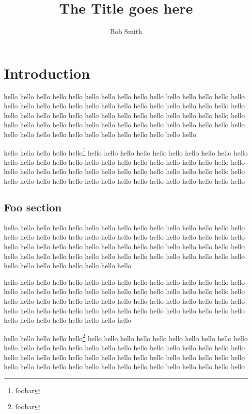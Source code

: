 \documentclass[11pt,letter,oneside]{book}
\author{Bob Smith}
\title{The Title goes here}
\begin{document}
\frontmatter

\chapter{Introduction}
hello hello hello hello hello hello hello hello hello hello hello hello hello hello hello hello hello hello hello hello hello hello hello hello hello hello hello hello hello hello hello hello hello hello hello hello hello hello hello hello hello hello hello hello hello hello hello hello hello hello hello hello hello hello hello hello hello hello hello hello hello hello hello hello hello hello hello hello hello hello hello hello

hello hello hello hello hello\footnote{foobar} hello hello hello hello hello hello hello hello hello hello hello hello hello hello hello hello hello hello hello hello hello hello hello hello hello hello hello hello hello hello hello hello hello hello hello hello hello hello hello hello hello hello hello hello hello hello hello hello hello hello hello hello hello hello hello

\section{Foo section}
hello hello hello hello hello hello hello hello hello hello hello hello hello hello hello hello hello hello hello hello hello hello hello hello hello hello hello hello hello hello hello hello hello hello hello hello hello hello hello hello hello hello hello hello hello hello hello hello hello hello hello hello hello hello hello hello hello hello hello hello hello hello hello hello hello hello hello hello

hello hello hello hello hello hello hello hello hello hello hello hello hello hello hello hello hello hello hello hello hello hello hello hello hello hello hello hello hello hello hello hello hello hello hello hello hello hello hello hello hello hello hello hello hello hello hello hello hello hello hello hello hello hello hello hello hello hello hello hello hello hello hello hello hello hello hello hello

hello hello hello hello hello\footnote{foobar} hello hello hello hello hello hello hello hello hello hello hello hello hello hello hello hello hello hello hello hello hello hello hello hello hello hello hello hello hello hello hello hello hello hello hello hello hello hello hello hello hello hello hello hello hello hello hello hello hello hello hello hello hello hello hello
\end{document}
